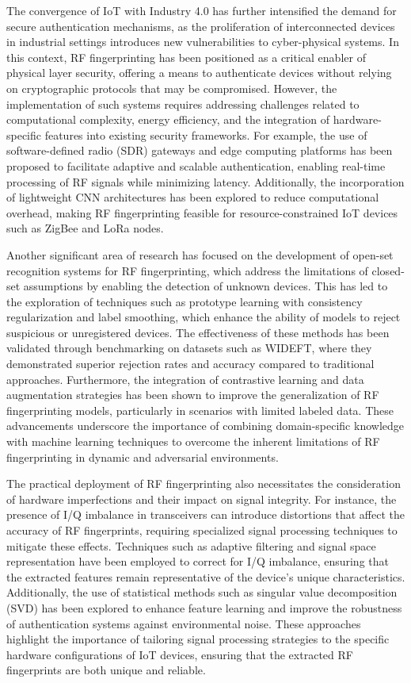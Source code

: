 \documentclass[conference]{IEEEtran}
\begin{document}
The convergence of IoT with Industry 4.0 has further intensified the demand for secure authentication mechanisms, as the proliferation of interconnected devices in industrial settings introduces new vulnerabilities to cyber-physical systems. In this context, RF fingerprinting has been positioned as a critical enabler of physical layer security, offering a means to authenticate devices without relying on cryptographic protocols that may be compromised. However, the implementation of such systems requires addressing challenges related to computational complexity, energy efficiency, and the integration of hardware-specific features into existing security frameworks. For example, the use of software-defined radio (SDR) gateways and edge computing platforms has been proposed to facilitate adaptive and scalable authentication, enabling real-time processing of RF signals while minimizing latency. Additionally, the incorporation of lightweight CNN architectures has been explored to reduce computational overhead, making RF fingerprinting feasible for resource-constrained IoT devices such as ZigBee and LoRa nodes.  

Another significant area of research has focused on the development of open-set recognition systems for RF fingerprinting, which address the limitations of closed-set assumptions by enabling the detection of unknown devices. This has led to the exploration of techniques such as prototype learning with consistency regularization and label smoothing, which enhance the ability of models to reject suspicious or unregistered devices. The effectiveness of these methods has been validated through benchmarking on datasets such as WIDEFT, where they demonstrated superior rejection rates and accuracy compared to traditional approaches. Furthermore, the integration of contrastive learning and data augmentation strategies has been shown to improve the generalization of RF fingerprinting models, particularly in scenarios with limited labeled data. These advancements underscore the importance of combining domain-specific knowledge with machine learning techniques to overcome the inherent limitations of RF fingerprinting in dynamic and adversarial environments.  

The practical deployment of RF fingerprinting also necessitates the consideration of hardware imperfections and their impact on signal integrity. For instance, the presence of I/Q imbalance in transceivers can introduce distortions that affect the accuracy of RF fingerprints, requiring specialized signal processing techniques to mitigate these effects. Techniques such as adaptive filtering and signal space representation have been employed to correct for I/Q imbalance, ensuring that the extracted features remain representative of the device's unique characteristics. Additionally, the use of statistical methods such as singular value decomposition (SVD) has been explored to enhance feature learning and improve the robustness of authentication systems against environmental noise. These approaches highlight the importance of tailoring signal processing strategies to the specific hardware configurations of IoT devices, ensuring that the extracted RF fingerprints are both unique and reliable.  
\end{document}
